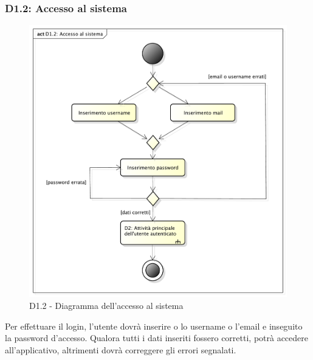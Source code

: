		\subsubsection{D1.2: Accesso al sistema} %
		\label{ssub:accesso_al_sistema}
		\begin{figure}[!htbp]
			\centering
			\centerline{\includegraphics[scale=0.45]{./images/D1_2.pdf}}
			\caption{D1.2 - Diagramma dell'accesso al sistema}
		\end{figure}
		\noindent
		Per effettuare il login, l'utente dovrà inserire o lo username o l'email e inseguito la password d'accesso. Qualora tutti i dati inseriti fossero corretti, potrà accedere all'applicativo, altrimenti dovrà correggere gli errori segnalati. \newline


		\pagebreak

